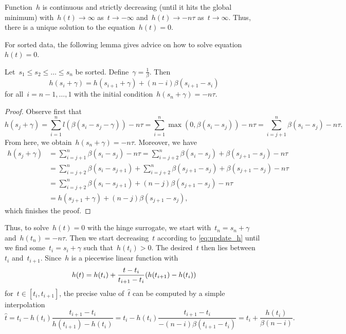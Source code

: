\begin{lemma}
  Function~$h$ is continuous and strictly decreasing (until it hits the global minimum) with~$h(t)\to \infty$ as~$t\to-\infty$ and~$h(t)\to -n\tau$ as~$t\to\infty$. Thus, there is a unique solution to the equation~$h(t)=0$.
\end{lemma}

For sorted data, the following lemma gives advice on how to solve equation~$h(t)=0$. 

\begin{lemma}
  Let~$s_1\le s_2 \le \dots \le s_n$ be sorted. Define~$\gamma= \frac{1}{\beta}$. Then 
  \begin{equation}\label{eq:update_h}
    h(s_i+\gamma) = h(s_{i+1}+\gamma) + (n-i)\beta(s_{i+1}-s_i)
  \end{equation}
  for all~$i=n-1,\dots,1$ with the initial condition~$h(s_n+\gamma)=-n\tau$.
\end{lemma}
\begin{proof}
Observe first that
\begin{equation*}
  h(s_j+\gamma)
  = \sum_{i=1}^n l(\beta(s_i-s_j-\gamma)) - n\tau
  = \sum_{i=1}^n\max(0,\beta(s_i-s_j)) - n\tau
  = \sum_{i=j+1}^n \beta(s_i-s_j) - n\tau.
\end{equation*}
From here, we obtain~$h(s_n+\gamma)=-n\tau$. Moreover, we have
\begin{equation*}
  \begin{aligned}
    h(s_j+\gamma)
    & = \sum_{i=j+1}^n \beta(s_i - s_j) - n\tau
      = \sum_{i=j+2}^n \beta(s_i - s_{j}) + \beta(s_{j+1}-s_{j})- n\tau \\
    & = \sum_{i=j+2}^n \beta(s_i - s_{j+1}) + \sum_{i=j+2}^n\beta(s_{j+1}-s_j) + \beta(s_{j+1}-s_{j})- n\tau \\
    & = \sum_{i=j+2}^n \beta(s_i-s_{j+1}) + (n-j)\beta(s_{j+1}-s_j)- n\tau \\
    & = h(s_{j+1}+\gamma) + (n-j)\beta(s_{j+1}-s_j),
  \end{aligned}
\end{equation*}
which finishes the proof.
\end{proof}

Thus, to solve~$h(t)=0$ with the hinge surrogate, we start with~$t_n=s_n+\gamma$ and~$h(t_n)=-n\tau$. Then we start decreasing~$t$ according to \eqref{eq:update_h} until we find some~$t_i=s_i+\gamma$ such that~$h(t_i)>0$. The desired~$t$ then lies between~$t_i$ and~$t_{i+1}$. Since~$h$ is a piecewise linear function with
\begin{equation*}
  h(t) = h(t_i) + \frac{t-t_i}{t_{i+1}-t_i}\Brac{h(t_{i+1})-h(t_i)}
\end{equation*}
for~$t\in [t_i,t_{i+1}]$, the precise value of~$\hat{t}$ can be computed by a simple interpolation
\begin{equation*}
  \hat{t}
  = t_i - h(t_i)\frac{t_{i+1}-t_i}{h(t_{i+1})-h(t_i)}
  = t_i - h(t_i)\frac{t_{i+1}-t_i}{-(n-i)\beta(t_{i+1}-t_{i})}
  = t_i + \frac{h(t_i)}{\beta(n-i)}.
\end{equation*}

